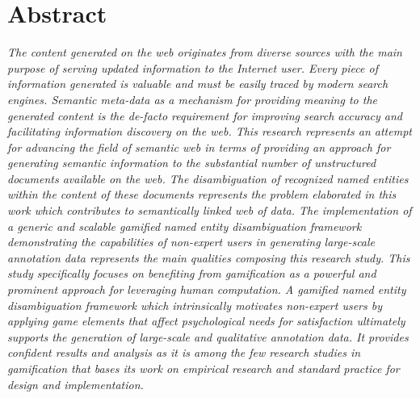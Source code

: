 \chapter*{Abstract}



\textit{The content generated on the web originates from diverse sources with the main purpose of serving updated information to the  Internet user. Every piece of information generated is valuable and must be easily traced by modern search engines. Semantic meta-data as a mechanism for providing meaning to the generated content is the de-facto requirement for improving search accuracy and facilitating information discovery on the web. This research represents an attempt for advancing the field of semantic web in terms of providing an approach for generating semantic information to the substantial number of unstructured documents available on the web. The disambiguation of recognized named entities within the content of these documents represents the problem elaborated in this work which contributes to semantically linked web of data. The implementation of a generic and scalable gamified named entity disambiguation framework demonstrating the capabilities of non-expert users in generating large-scale annotation data represents the main qualities composing this research study. This study specifically focuses on benefiting from gamification as a powerful and prominent approach for leveraging human computation. A gamified named entity disambiguation framework which intrinsically motivates non-expert users by applying game elements that affect psychological needs for satisfaction ultimately supports the generation of large-scale and qualitative annotation data. It provides confident results and analysis as it is among the few research studies in gamification that bases its work on empirical research and standard practice for design and implementation.}

\hypersetup{pageanchor=false}